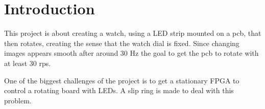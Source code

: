 \section{Introduction}
This project is about creating a watch, using a LED strip mounted on a pcb, that then rotates, creating the sense that the watch dial is fixed. 
Since changing images appears smooth after around 30 Hz \cite{article:rpm} the goal to get the pcb to rotate with at least 30 rps.

One of the biggest challenges of the project is to get a stationary FPGA to control a rotating board with LEDs.
A slip ring is made to deal with this problem.